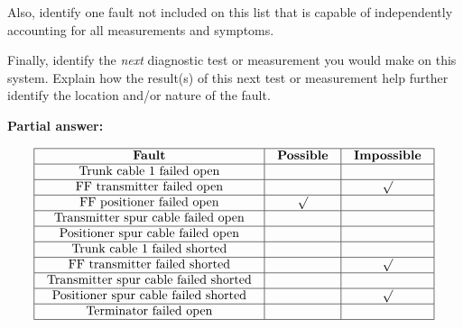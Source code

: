 Also, identify one fault not included on this list that is capable of independently accounting for all measurements and symptoms.

Finally, identify the {\it next} diagnostic test or measurement you would make on this system.  Explain how the result(s) of this next test or measurement help further identify the location and/or nature of the fault.







\noindent
{\bf Partial answer:}


$$\vbox{\offinterlineskip
\halign{\strut
\vrule \quad\hfil # \ \hfil & 
\vrule \quad\hfil # \ \hfil & 
\vrule \quad\hfil # \ \hfil \vrule \cr
\noalign{\hrule}
%
{\bf Fault} & {\bf Possible} & {\bf Impossible} \cr
%
\noalign{\hrule}
%
Trunk cable 1 failed open &  &  \cr
%
\noalign{\hrule}
%
FF transmitter failed open &  & $\surd$ \cr
%
\noalign{\hrule}
%
FF positioner failed open & $\surd$ &  \cr
%
\noalign{\hrule}
%
Transmitter spur cable failed open &  &  \cr
%
\noalign{\hrule}
%
Positioner spur cable failed open &  &  \cr
%
\noalign{\hrule}
%
Trunk cable 1 failed shorted &  &  \cr
%
\noalign{\hrule}
%
FF transmitter failed shorted &  & $\surd$ \cr
%
\noalign{\hrule}
%
Transmitter spur cable failed shorted &  &  \cr
%
\noalign{\hrule}
%
Positioner spur cable failed shorted &  & $\surd$ \cr
%
\noalign{\hrule}
%
Terminator failed open &  &  \cr
%
\noalign{\hrule}
} %
}$$ %









